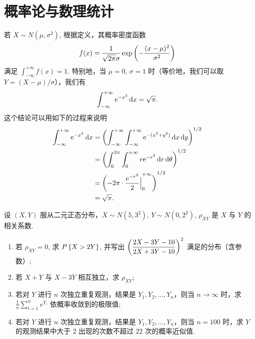 \section{概率论与数理统计}

\begin{exercise}
    若 $X \sim N(\mu, \sigma^2)$, 根据定义，其概率密度函数
    \[
        f(x) = \frac{1}{\sqrt{2 \pi} \sigma} \exp\del[3]{-\frac{(x - \mu)^2}{\sigma^2}}
    \]
    满足 $\int_{-\infty}^{+\infty} f(x) = 1$. 特别地，当 $\mu = 0$, $\sigma = 1$ 时（等价地，我们可以取 $Y = (X - \mu) / \sigma$），我们有
    \[
        \int_{-\infty}^{+\infty} \mathrm{e}^{-x^2} \mathop{}\!\mathrm{d} x = \sqrt{\pi}.
    \]
    这个结论可以用如下的过程来说明
    \begin{align*}
        \int_{-\infty}^{+\infty} \mathe^{-x^2} \dx
        &= \del[3]{\int_{-\infty}^{+\infty}\int_{-\infty}^{+\infty} \mathe^{-(x^2+y^2)} \dx\dif y}^{1/2} \\
        &= \del[3]{\int_0^{2\pi} \int_0^{+\infty} r \mathe^{-r^2} \dif r\dif\theta}^{1/2} \\
        &= \del[3]{-2\pi \cdot \eval[2]{\frac{\mathe^{-r^2}}{2}}_0^{+\infty}}^{1/2} \\
        &= \sqrt{\pi}.
    \end{align*}
\end{exercise}

\begin{exercise}[12--13 春夏]
    设 $(X, Y)$ 服从二元正态分布，$X \sim N(5, 3^2)$, $Y　\sim N(0, 2^2)$, $\rho_{XY}$ 是 $X$ 与 $Y$ 的相关系数.
    \begin{enumerate}
        \item 若 $\rho_{XY} = 0$, 求 $P\set{X > 2Y}$, 并写出 $\displaystyle \del[3]{\frac{2X - 3Y - 10}{2X + 3Y - 10}}^2$ 满足的分布（含参数）;
        
        \item 若 $X + Y$ 与 $X - 3Y$ 相互独立，求 $\rho_{XY}$;
        
        \item 若对 $Y$ 进行 $n$ 次独立重复观测，结果是 $Y_1, Y_2, \ldots, Y_n$，则当 $n \to \infty$ 时，求 $\displaystyle \frac 1n \sum_{i = 1}^n e^{Y_i}$ 依概率收敛到的极限值;
        
        \item 若对 $Y$ 进行 $n$ 次独立重复观测，结果是 $Y_1, Y_2, \ldots, Y_n$，则当 $n = 100$ 时，求 $Y$ 的观测结果中大于 $2$ 出现的次数不超过 $22$ 次的概率近似值.
    \end{enumerate}
\end{exercise}

